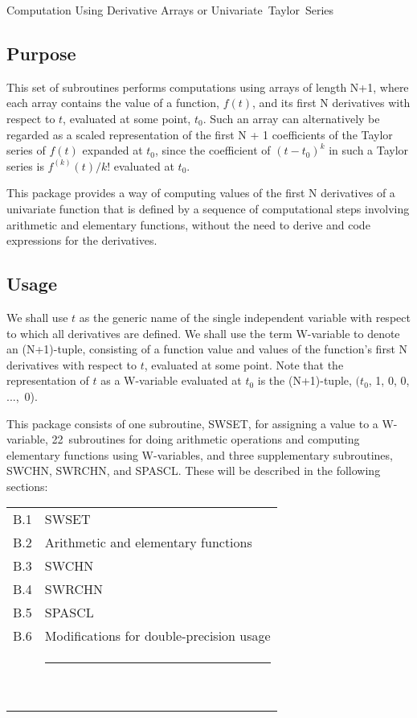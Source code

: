 \documentclass[twoside]{MATH77}
\begin{document}
 Computation Using Derivative Arrays or
\hbox{Univariate Taylor Series}


\subsection{Purpose}

This set of subroutines performs computations using arrays of length N+1,
where each array contains the value of a function, $f(t)$, and its first N
derivatives with respect to $t$, evaluated at some point, $t_0$. Such an
array can alternatively be regarded as a scaled representation of the first
N + 1 coefficients of the Taylor series of $f(t)$ expanded at $t_0$, since
the coefficient of $(t-t_0)^k$ in such a Taylor series is $f^{(k)}(t)/k!$
evaluated at $t_0.$

This package provides a way of computing values of the first N derivatives
of a univariate function that is defined by a sequence of computational
steps involving arithmetic and elementary functions, without the need to
derive and code expressions for the derivatives.

\subsection{Usage}

We shall use $t$ as the generic name of the single independent variable with
respect to which all derivatives are defined. We shall use the term
W-variable to denote an (N+1)-tuple, consisting of a function value and
values of the function's first N derivatives with respect to $t$, evaluated
at some point. Note that the representation of $t$ as a W-variable evaluated
at $t_0$ is the (N+1)-tuple, $(t_0$, 1, 0, 0, ...,~0).

This package consists of one subroutine, SWSET, for assigning a value to a
W-variable, 22~subroutines for doing arithmetic operations and computing
elementary functions using W-variables, and three supplementary subroutines,
SWCHN, SWRCHN, and SPASCL. These will be described in the following sections:

\begin{tabular*}{3.3in}{@{}l@{~~}l}
B.1 & SWSET\dotfill \pageref{B1}\\
B.2 & Arithmetic and elementary functions\dotfill \pageref{B2}\\
B.3 & SWCHN\dotfill \pageref{B3}\\
B.4 & SWRCHN\dotfill \pageref{B4}\\
B.5 & SPASCL\dotfill \pageref{B5}\\
B.6 & Modifications for double-precision usage\dotfill \pageref{B6}\\
 & \rule{3in}{0pt}~
\end{tabular*}\vspace{-5pt}
\end{document}
